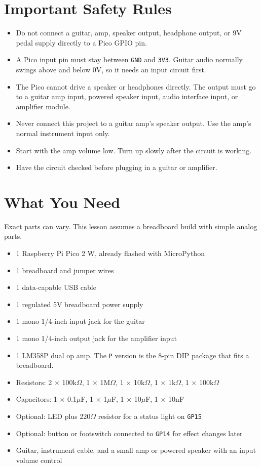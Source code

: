 \documentclass[11pt,letterpaper]{article}
\newcommand{\pin}[1]{\texttt{#1}}
\begin{document}
\section*{Important Safety Rules}
\begin{itemize}
    \item Do not connect a guitar, amp, speaker output, headphone output, or 9V pedal supply directly to a Pico GPIO pin.
    \item A Pico input pin must stay between \texttt{GND} and \texttt{3V3}. Guitar audio normally swings above and below 0V, so it needs an input circuit first.
    \item The Pico cannot drive a speaker or headphones directly. The output must go to a guitar amp input, powered speaker input, audio interface input, or amplifier module.
    \item Never connect this project to a guitar amp's speaker output. Use the amp's normal instrument input only.
    \item Start with the amp volume low. Turn up slowly after the circuit is working.
    \item Have the circuit checked before plugging in a guitar or amplifier.
\end{itemize}

\section*{What You Need}
Exact parts can vary. This lesson assumes a breadboard build with simple analog parts.

\begin{itemize}
    \item 1 Raspberry Pi Pico 2 W, already flashed with MicroPython
    \item 1 breadboard and jumper wires
    \item 1 data-capable USB cable
    \item 1 regulated 5V breadboard power supply
    \item 1 mono 1/4-inch input jack for the guitar
    \item 1 mono 1/4-inch output jack for the amplifier input
    \item 1 LM358P dual op amp. The \texttt{P} version is the 8-pin DIP package that fits a breadboard.
    \item Resistors: 2 $\times$ 100k$\Omega$, 1 $\times$ 1M$\Omega$, 1 $\times$ 10k$\Omega$, 1 $\times$ 1k$\Omega$, 1 $\times$ 100k$\Omega$
    \item Capacitors: 1 $\times$ 0.1$\mu$F, 1 $\times$ 1$\mu$F, 1 $\times$ 10$\mu$F, 1 $\times$ 10nF
    \item Optional: LED plus 220$\Omega$ resistor for a status light on \pin{GP15}
    \item Optional: button or footswitch connected to \pin{GP14} for effect changes later
    \item Guitar, instrument cable, and a small amp or powered speaker with an input volume control
\end{itemize}
\end{document}
